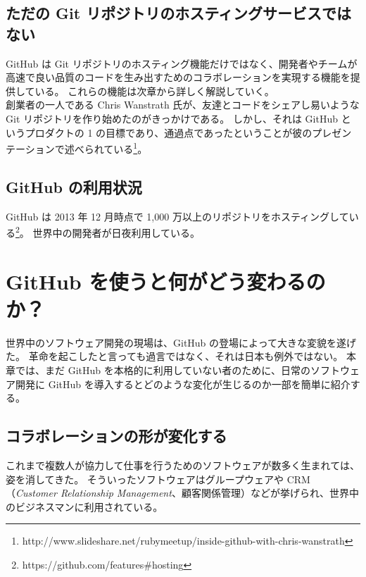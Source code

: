 \subsection{ただの Git リポジトリのホスティングサービスではない}
GitHub は Git リポジトリのホスティング機能だけではなく、開発者やチームが高速で良い品質のコードを生み出すためのコラボレーションを実現する機能を提供している。
これらの機能は次章から詳しく解説していく。\\

創業者の一人である Chris Wanstrath 氏が、友達とコードをシェアし易いような Git リポジトリを作り始めたのがきっかけである。
しかし、それは GitHub というプロダクトの 1 の目標であり、通過点であったということが彼のプレゼンテーションで述べられている\footnote{http://www.slideshare.net/rubymeetup/inside-github-with-chris-wanstrath}。
\subsection{GitHub の利用状況}
GitHub は 2013 年 12 月時点で 1,000 万以上のリポジトリをホスティングしている\footnote{https://github.com/features\#hosting}。
世界中の開発者が日夜利用している。
\section{GitHub を使うと何がどう変わるのか？}
世界中のソフトウェア開発の現場は、GitHub の登場によって大きな変貌を遂げた。
革命を起こしたと言っても過言ではなく、それは日本も例外ではない。
本章では、まだ GitHub を本格的に利用していない者のために、日常のソフトウェア開発に GitHub を導入するとどのような変化が生じるのか一部を簡単に紹介する。
\subsection{コラボレーションの形が変化する}
これまで複数人が協力して仕事を行うためのソフトウェアが数多く生まれては、姿を消してきた。
そういったソフトウェアはグループウェアや CRM（\emph{Customer Relationship Management}、顧客関係管理）などが挙げられ、世界中のビジネスマンに利用されている。\\

